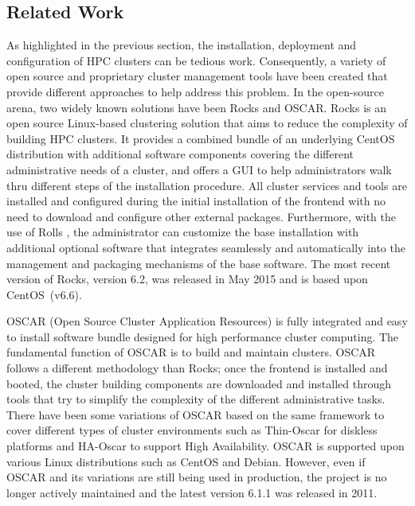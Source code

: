 \subsection{Related Work} \label{sec:related_work}

As highlighted in the previous section, the installation, deployment and
configuration of HPC clusters can be tedious work.  Consequently, a variety of
open source and proprietary cluster management tools have been created that
provide different approaches to help address this problem.  In the open-source
arena, two widely known solutions have been Rocks and OSCAR.  Rocks
\cite{rocks2003,rocks_url} is an open source Linux-based clustering solution
that aims to reduce the complexity of building HPC clusters.  It provides a
combined bundle of an underlying CentOS distribution with additional software
components covering the different administrative needs of a cluster, 
and offers a GUI to help administrators walk thru
different steps of the installation procedure.  All cluster services and tools
are installed and configured during the initial installation of the frontend
with no need to download and %
configure other external
packages. Furthermore, with the use of Rolls \cite{rolls2004}, the
administrator can customize the base installation
with additional
optional software that integrates seamlessly and automatically into the management and
packaging mechanisms of the base software.
The most recent version of Rocks, version 6.2, was released in May 2015 and is
based upon CentOS~(v6.6).

OSCAR \cite{oscar2001,oscar_url} (Open Source Cluster Application Resources) is
fully integrated and easy to install software bundle designed for high
performance cluster computing. The fundamental function of OSCAR is to build
and maintain clusters.  OSCAR follows a different methodology than Rocks; once
the frontend is installed and booted, the cluster building components are
downloaded and installed through tools that try to simplify the complexity of
the different administrative tasks.  There have been some variations of OSCAR
based on the same framework to cover different types of cluster environments
such as Thin-Oscar for diskless platforms and HA-Oscar to support High
Availability. OSCAR is supported upon various Linux distributions such as
CentOS and Debian. However, even if OSCAR and its variations are still being
used in production, the project is no longer actively maintained and the latest
version 6.1.1 was released in 2011.

